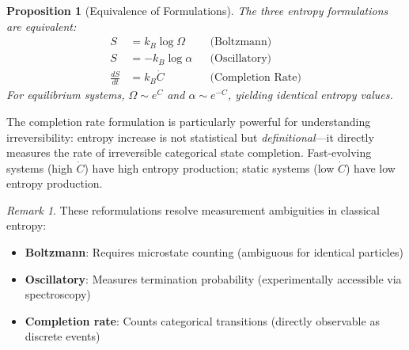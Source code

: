 \documentclass[twocolumn,superscriptaddress,prb,10pt]{revtex4-2}
\newtheorem{proposition}[theorem]{Proposition}
\theoremstyle{definition}
\theoremstyle{remark}
\newtheorem{remark}[theorem]{Remark}
\begin{document}
\begin{proposition}[Equivalence of Formulations]
\label{prop:entropy_equivalence}
The three entropy formulations are equivalent:
\begin{align}
S &= k_B \log \Omega && \text{(Boltzmann)} \\
S &= -k_B \log \alpha && \text{(Oscillatory)} \\
\frac{dS}{dt} &= k_B \dot{C} && \text{(Completion Rate)}
\end{align}
For equilibrium systems, $\Omega \sim e^{C}$ and $\alpha \sim e^{-C}$, yielding identical entropy values.
\end{proposition}

The completion rate formulation is particularly powerful for understanding irreversibility: entropy increase is not statistical but \emph{definitional}—it directly measures the rate of irreversible categorical state completion. Fast-evolving systems (high $\dot{C}$) have high entropy production; static systems (low $\dot{C}$) have low entropy production.

\begin{remark}
These reformulations resolve measurement ambiguities in classical entropy:
\begin{itemize}
\item \textbf{Boltzmann}: Requires microstate counting (ambiguous for identical particles)
\item \textbf{Oscillatory}: Measures termination probability (experimentally accessible via spectroscopy)
\item \textbf{Completion rate}: Counts categorical transitions (directly observable as discrete events)
\end{itemize}
\end{remark}
\end{document}
